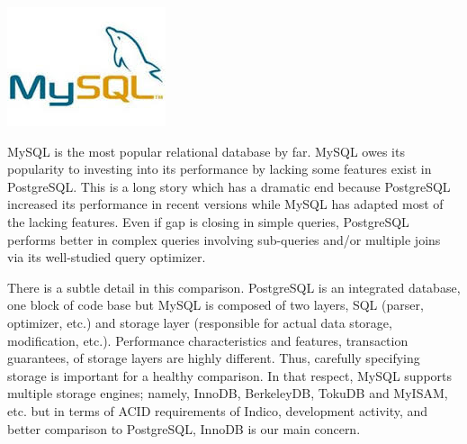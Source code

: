 \vspace{-2.2cm} \hspace{3.2cm} \includegraphics[scale=0.5]{3/figures/mysql.jpg}

MySQL is the most popular relational database by far. MySQL owes its popularity to investing into its performance by lacking some features exist in PostgreSQL. This is a long story which has a dramatic end because PostgreSQL increased its performance in recent versions while MySQL has adapted most of the lacking features. Even if gap is closing in simple queries, PostgreSQL performs better in complex queries involving sub-queries and/or multiple joins via its well-studied query optimizer.

There is a subtle detail in this comparison. PostgreSQL is an integrated database, one block of code base but MySQL is composed of two layers, SQL (parser, optimizer, etc.) and storage layer (responsible for actual data storage, modification, etc.). Performance characteristics and features, transaction guarantees, of storage layers are highly different. Thus, carefully specifying storage is important for a healthy comparison. In that respect, MySQL supports multiple storage engines; namely, InnoDB, BerkeleyDB, TokuDB and MyISAM, etc. but in terms of ACID requirements of Indico, development activity, and better comparison to PostgreSQL, InnoDB is our main concern.

